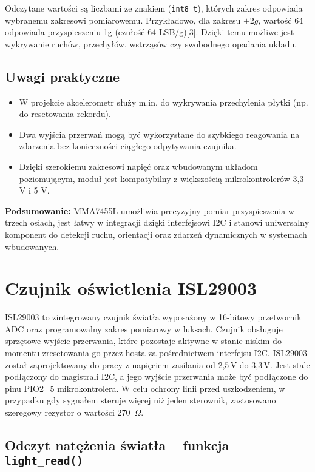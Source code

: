 \documentclass[a4paper,12pt]{report}
\begin{document}
Odczytane wartości są liczbami ze znakiem (\texttt{int8\_t}), których zakres odpowiada wybranemu zakresowi pomiarowemu. Przykładowo, dla zakresu \(\pm2g\), wartość 64 odpowiada przyspieszeniu 1g (czułość 64 LSB/g)[3]. Dzięki temu możliwe jest wykrywanie ruchów, przechyłów, wstrząsów czy swobodnego opadania układu.

\subsection*{Uwagi praktyczne}

\begin{itemize}
    \item W projekcie akcelerometr służy m.in. do wykrywania przechylenia płytki (np. do resetowania rekordu).
    \item Dwa wyjścia przerwań mogą być wykorzystane do szybkiego reagowania na zdarzenia bez konieczności ciągłego odpytywania czujnika.
    \item Dzięki szerokiemu zakresowi napięć oraz wbudowanym układom poziomującym, moduł jest kompatybilny z większością mikrokontrolerów 3,3 V i 5 V.
\end{itemize}

\textbf{Podsumowanie:}  
MMA7455L umożliwia precyzyjny pomiar przyspieszenia w trzech osiach, jest łatwy w integracji dzięki interfejsowi I2C i stanowi uniwersalny komponent do detekcji ruchu, orientacji oraz zdarzeń dynamicznych w systemach wbudowanych.

\section{Czujnik oświetlenia ISL29003}

ISL29003 to zintegrowany czujnik światła wyposażony w 16-bitowy przetwornik ADC oraz programowalny zakres pomiarowy w luksach. Czujnik obsługuje sprzętowe wyjście przerwania, które pozostaje aktywne w stanie niskim do momentu zresetowania go przez hosta za pośrednictwem interfejsu I2C. ISL29003 został zaprojektowany do pracy z napięciem zasilania od 2,5\,V do 3,3\,V. Jest stale podłączony do magistrali I2C, a jego wyjście przerwania może być podłączone do pinu PIO2\_5 mikrokontrolera. W celu ochrony linii przed uszkodzeniem, w przypadku gdy sygnałem steruje więcej niż jeden sterownik, zastosowano szeregowy rezystor o wartości 270~$\Omega$.

\subsection*{Odczyt natężenia światła – funkcja \texttt{light\_read()}}
\end{document}
